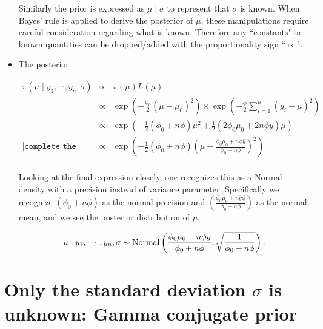 \documentclass[11pt]{article}
\begin{document}
\begin{itemize}
Similarly the prior is expressed as $\mu \mid \sigma$ to represent that $\sigma$ is known. When Bayes' rule is applied to derive the posterior of $\mu$, these manipulations require careful consideration regarding what is known.   Therefore any ``constants" or known quantities can be dropped/added with the proportionality sign ``$\propto$". 

\item The posterior:

\begin{eqnarray}
\pi(\mu \mid y_1, \cdots, y_n, \sigma) &\propto&  \pi(\mu) L(\mu) \nonumber \\
&\propto& \exp\left(-\frac{\phi_0}{2}(\mu - \mu_0)^2\right) \times \exp\left(-\frac{\phi}{2}\sum_{i=1}^{n}(y_i - \mu)^2\right) \nonumber \\
&\propto& \exp\left(-\frac{1}{2}(\phi_0 +n\phi)\mu^2 + \frac{1}{2}(2\phi_0\mu_0 + 2n\phi\bar{y})\mu\right) \nonumber \\
\texttt{[complete the square]} &\propto& \exp\left(-\frac{1}{2}(\phi_0 + n\phi)\left(\mu - \frac{\phi_0 \mu_0 + n\phi\bar{y} }{\phi_0 + n \phi}\right)^2\right) \nonumber \\
\end{eqnarray}


Looking at the final expression closely, one recognizes this as a Normal density with a precision instead of variance parameter.
Specifically we recognize $(\phi_0 + n \phi)$ as the normal precision  and $(\frac{\phi_0 \mu_0 + n\bar{y} \phi}{\phi_0 + n \phi})$ as the normal mean, and we see the posterior distribution of $\mu$,

\begin{eqnarray}
\mu \mid y_1, \cdots, y_n, \sigma \sim {\rm{Normal}}\left(\frac{\phi_0 \mu_0 + n\phi\bar{y} }{\phi_0 + n \phi}, \sqrt{\frac{1}{\phi_0 + n \phi}}\right).
\end{eqnarray}
\end{itemize}



\section{Only the standard deviation $\sigma$ is unknown: Gamma conjugate prior}
\end{document}
